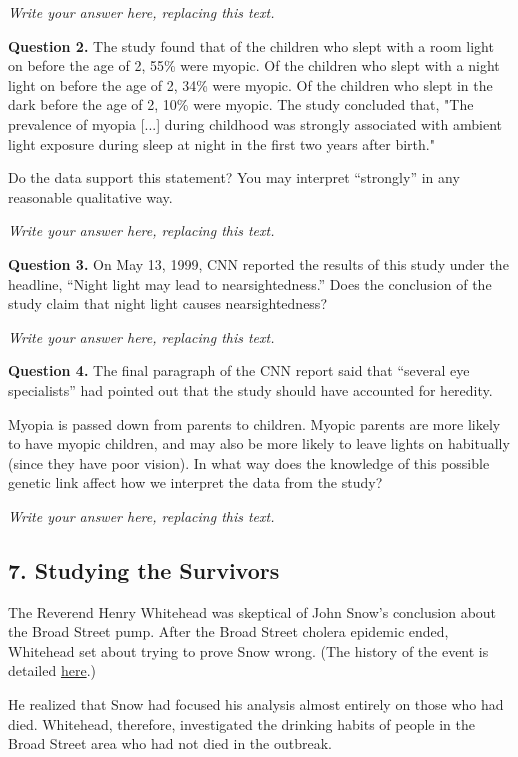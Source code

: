 \documentclass[11pt]{article}
\begin{document}
    \emph{Write your answer here, replacing this text.}

    \textbf{Question 2.} The study found that of the children who slept with
a room light on before the age of 2, 55\% were myopic. Of the children
who slept with a night light on before the age of 2, 34\% were myopic.
Of the children who slept in the dark before the age of 2, 10\% were
myopic. The study concluded that, "The prevalence of myopia {[}...{]}
during childhood was strongly associated with ambient light exposure
during sleep at night in the first two years after birth."

Do the data support this statement? You may interpret ``strongly'' in
any reasonable qualitative way.

    \emph{Write your answer here, replacing this text.}

    \textbf{Question 3.} On May 13, 1999, CNN reported the results of this
study under the headline, ``Night light may lead to nearsightedness.''
Does the conclusion of the study claim that night light causes
nearsightedness?

    \emph{Write your answer here, replacing this text.}

    \textbf{Question 4.} The final paragraph of the CNN report said that
``several eye specialists'' had pointed out that the study should have
accounted for heredity.

Myopia is passed down from parents to children. Myopic parents are more
likely to have myopic children, and may also be more likely to leave
lights on habitually (since they have poor vision). In what way does the
knowledge of this possible genetic link affect how we interpret the data
from the study?

    \emph{Write your answer here, replacing this text.}

    \subsection{7. Studying the Survivors}\label{studying-the-survivors}

    The Reverend Henry Whitehead was skeptical of John Snow's conclusion
about the Broad Street pump. After the Broad Street cholera epidemic
ended, Whitehead set about trying to prove Snow wrong. (The history of
the event is detailed
\href{http://www.ncbi.nlm.nih.gov/pmc/articles/PMC1034367/pdf/medhist00183-0026.pdf}{here}.)

He realized that Snow had focused his analysis almost entirely on those
who had died. Whitehead, therefore, investigated the drinking habits of
people in the Broad Street area who had not died in the outbreak.
\end{document}
